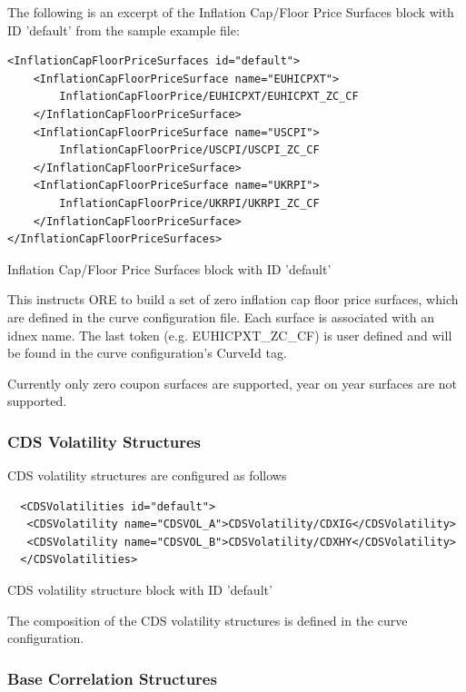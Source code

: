 \documentclass[12pt, a4paper]{article}
\begin{document}
The following is an excerpt of the Inflation Cap/Floor Price Surfaces block with ID 'default' from the sample example
file:

\begin{listing}[H]
\begin{verbatim}
<InflationCapFloorPriceSurfaces id="default">
    <InflationCapFloorPriceSurface name="EUHICPXT">
        InflationCapFloorPrice/EUHICPXT/EUHICPXT_ZC_CF
    </InflationCapFloorPriceSurface>
    <InflationCapFloorPriceSurface name="USCPI">
        InflationCapFloorPrice/USCPI/USCPI_ZC_CF
    </InflationCapFloorPriceSurface>
    <InflationCapFloorPriceSurface name="UKRPI">
        InflationCapFloorPrice/UKRPI/UKRPI_ZC_CF
    </InflationCapFloorPriceSurface>
</InflationCapFloorPriceSurfaces>
\end{verbatim}
\caption{Inflation Cap/Floor Price Surfaces block with ID 'default'}
\label{lst:yoyinflationindexcurve_spec}
\end{listing}

This instructs ORE to build a set of zero inflation cap floor price surfaces, which are defined in the curve
configuration file. Each surface is associated with an idnex name. The last token (e.g. EUHICPXT\_ZC\_CF) is user defined
and will be found in the curve configuration's CurveId tag.

Currently only zero coupon surfaces are supported, year on year surfaces are not supported.

\subsubsection{CDS Volatility Structures}

CDS volatility structures are configured as follows
\begin{listing}[H]
\begin{verbatim}
  <CDSVolatilities id="default">
   <CDSVolatility name="CDSVOL_A">CDSVolatility/CDXIG</CDSVolatility>
   <CDSVolatility name="CDSVOL_B">CDSVolatility/CDXHY</CDSVolatility>
  </CDSVolatilities>
\end{verbatim}
\caption{CDS volatility structure block with ID 'default'}
\label{lst:cdsvol_spec}
\end{listing}

The composition of the CDS volatility structures is defined in the curve configuration.

\subsubsection{Base Correlation Structures}
\end{document}
